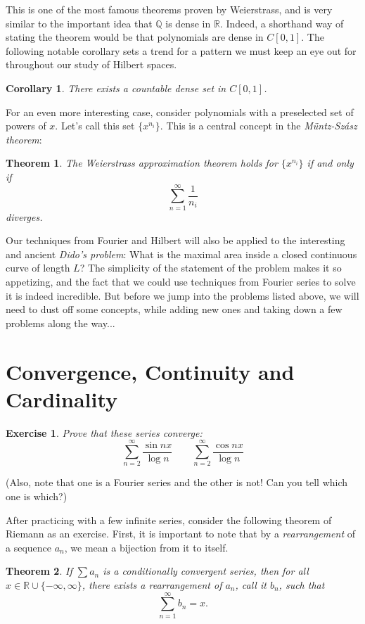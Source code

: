 \documentclass{article}
\newtheorem{thm}{Theorem}[section]
\newtheorem{cor}{Corollary}[section]
\newtheorem{exer}{Exercise}[section]
\begin{document}
This is one of the most famous theorems proven by Weierstrass, and is very similar to the important idea that $\mathbb{Q}$ is dense in $\mathbb{R}$. Indeed, a shorthand way of stating the theorem would be that polynomials are dense in $C[0,1]$. The following notable corollary sets a trend for a pattern we must keep an eye out for throughout our study of Hilbert spaces.
\begin{cor}
There exists a countable dense set in $C[0,1]$.
\end{cor}

For an even more interesting case, consider polynomials with a preselected set of powers of $x$. Let's call this set $\{x^{n_{i}} \}$. This is a central concept in the \textit{M\"{u}ntz-Sz\'{a}sz theorem}:

\begin{thm}
The Weierstrass approximation theorem holds for $\{x^{n_{i}} \}$ if and only if  $$\sum_{n=1}^{\infty} \frac{1}{n_{i}}$$ diverges.
\end{thm}

Our techniques from Fourier and Hilbert will also be applied to the interesting and ancient \textit{Dido's problem}: What is the maximal area inside a closed continuous curve of length $L$? The simplicity of the statement of the problem makes it so appetizing, and the fact that we could use techniques from Fourier series to solve it is indeed incredible. But before we jump into the problems listed above, we will need to dust off some concepts, while adding new ones and taking down a few problems along the way...

\section{Convergence, Continuity and Cardinality}

\begin{exer} Prove that these series converge:
$$\sum_{n=2}^{\infty} \frac{\sin nx}{\log n} \qquad \sum_{n=2}^{\infty} \frac{\cos nx}{\log n}$$
\end{exer}
(Also, note that one is a Fourier series and the other is not! Can you tell which one is which?)

After practicing with a few infinite series, consider the following theorem of Riemann as an exercise. First, it is important to note that by a \textit{rearrangement} of a sequence $a_{n}$, we mean a bijection from it to itself.
\pagebreak

\begin{thm}
If $\sum a_{n}$ is a conditionally convergent series, then for all $x \in \mathbb{R} \cup \{ -\infty, \infty \}$, there exists a rearrangement of $a_{n}$, call it $b_{n}$, such that $$\sum_{n=1}^{\infty} b_{n} = x.$$
\end{thm}
\end{document}
